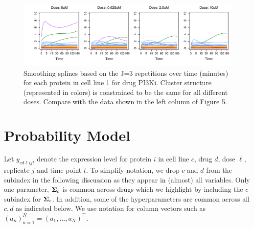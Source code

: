 \begin{figure}[tbp] 
\centering
\includegraphics[scale=0.55]{figs_supporting_info/SuppInfo_ea_splines_11}
\caption{Smoothing splines based on the J=3 repetitions over time (minutes) for each
protein in cell line 1 for drug PI3Ki. Cluster structure (represented in colors) is
constrained to be the same for all different doses.
Compare with the data shown in the left column of Figure 5.}
\label{fig:splines}
\end{figure}


\section{Probability Model}
\label{sec:model}

\vspace{0.5 cm}

Let $y_{cd\ell ijt}$ denote the expression level for protein $i$
in cell line $c$, drug $d$, dose $\ell$, replicate $j$ and time point $t$. To simplify notation, we drop $c$ and $d$ from the subindex in the following discussion as they appear in
(almost) all variables. Only one parameter, $\mbox{\boldmath $\Sigma$}_c$ is common across
drugs which we highlight by including the $c$ subindex for $\mbox{\boldmath $\Sigma$}_c$. In addition,
some of the hyperparameters are common across all $c,d$ as indicated below. 
We use notation for column vectors such as $(a_n)^N_{n=1} = (a_1, \ldots, a_N)^{\top}$.

